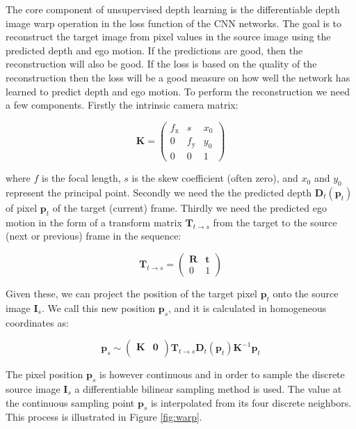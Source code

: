 The core component of unsupervised depth learning is the differentiable depth image warp operation in the loss function of the CNN networks. The goal is to reconstruct the target image from pixel values in the source image using the predicted depth and ego motion. If the predictions are good, then the reconstruction will also be good. If the loss is based on the quality of the reconstruction then the loss will be a good measure on how well the network has learned to predict depth and ego motion. To perform the reconstruction we need a few components. Firstly the intrinsic camera matrix:

\begin{equation}
\textbf{K} = 
\begin{pmatrix}
f_\mathrm{x} & s & x_0 \\
0 & f_\mathrm{y} & y_0 \\
0 & 0   & 1
\end{pmatrix}
\end{equation}

where $f$ is the focal length, $s$ is the skew coefficient (often zero), and $x_0$ and $y_0$ represent the principal point. Secondly we need the the predicted depth $ \textbf{D}_t(\textbf{p}_t) $ of pixel $ \textbf{p}_t $ of the target (current) frame. Thirdly we need the predicted ego motion in the form of a transform matrix $ \textbf{T}_{t \rightarrow s} $ from the target to the source (next or previous) frame in the sequence:

\begin{equation}
\textbf{T}_{t \rightarrow s} =
\begin{pmatrix}
\textbf{R} & \textbf{t} \\
0 & 1
\end{pmatrix}
\end{equation}

Given these, we can project the position of the target pixel $ \textbf{p}_t $ onto the source image $\textbf{I}_s$. We call this new position $ \textbf{p}_s $, and it is calculated in homogeneous coordinates as:

\begin{equation}
\textbf{p}_s \sim 
\begin{pmatrix}
\textbf{K}  & \textbf{0} \\
\end{pmatrix}
\textbf{T}_{t \rightarrow s} \textbf{D}_t(\textbf{p}_t) \textbf{K}^{-1} \textbf{p}_t 
\end{equation}

The pixel position $ \textbf{p}_s $ is however continuous and in order to sample the discrete source image $ \textbf{I}_s $ a differentiable bilinear sampling method is used\cite{spatialtransformernetworks}. The value at the continuous sampling point $\textbf{p}_s$ is interpolated from its four discrete neighbors. This process is illustrated in Figure \ref{fig:warp}.


